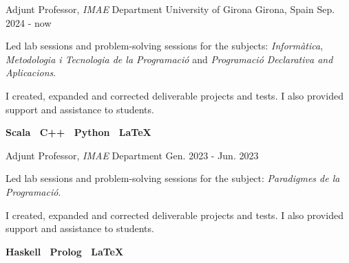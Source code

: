 

\begin{cventries}

  \cventry
    {Adjunt Professor, \textit{IMAE} Department}
    {University of Girona}
    {Girona, Spain}
    {Sep. 2024 - now}
    {
    \begin{cvitems}
    \item{Led lab sessions and problem-solving sessions for the subjects: \textit{Informàtica}, \textit{Metodologia i Tecnologia de la Programació} and \textit{Programació Declarativa and Aplicacions}.}
    \item{I created, expanded and corrected deliverable projects and tests. I also provided support and assistance to students.}
    \item {
      \textbf{
        Scala \textbar \
        C++ \textbar \
        Python \textbar \
        \LaTeX
      }
    }
    \end{cvitems}
  }
  \cventry
    {Adjunt Professor, \textit{IMAE} Department}
    {} %
    {} %
    {Gen. 2023 - Jun. 2023} %
    {
    \begin{cvitems}
    \item{Led lab sessions and problem-solving sessions for the subject: \textit{Paradigmes de la Programació}.}
    \item{I created, expanded and corrected deliverable projects and tests. I also provided support and assistance to students.}
    \item {
      \textbf{
        Haskell \textbar \
        Prolog \textbar \
        \LaTeX
      }
    }
    \end{cvitems}
    \vspace{0.25cm}
 	  }



\end{cventries}

